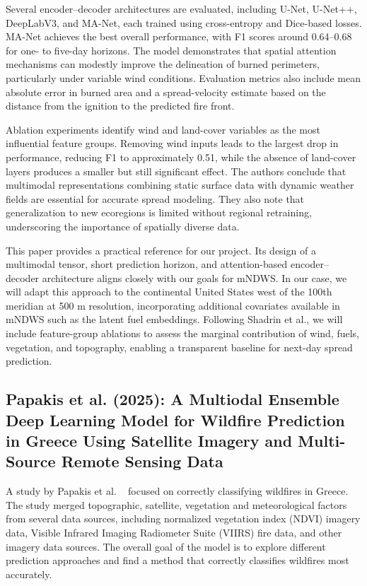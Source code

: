 \documentclass[conference]{IEEEtran}
\begin{document}
Several encoder–decoder architectures are evaluated, including U-Net, U-Net++, DeepLabV3, and MA-Net, each trained using cross-entropy and Dice-based losses. MA-Net achieves the best overall performance, with F1 scores around 0.64–0.68 for one- to five-day horizons. The model demonstrates that spatial attention mechanisms can modestly improve the delineation of burned perimeters, particularly under variable wind conditions. Evaluation metrics also include mean absolute error in burned area and a spread-velocity estimate based on the distance from the ignition to the predicted fire front.

Ablation experiments identify wind and land-cover variables as the most influential feature groups. Removing wind inputs leads to the largest drop in performance, reducing F1 to approximately 0.51, while the absence of land-cover layers produces a smaller but still significant effect. The authors conclude that multimodal representations combining static surface data with dynamic weather fields are essential for accurate spread modeling. They also note that generalization to new ecoregions is limited without regional retraining, underscoring the importance of spatially diverse data.

This paper provides a practical reference for our project. Its design of a multimodal tensor, short prediction horizon, and attention-based encoder–decoder architecture aligns closely with our goals for mNDWS. In our case, we will adapt this approach to the continental United States west of the 100th meridian at 500 m resolution, incorporating additional covariates available in mNDWS such as the latent fuel embeddings. Following Shadrin et al., we will include feature-group ablations to assess the marginal contribution of wind, fuels, vegetation, and topography, enabling a transparent baseline for next-day spread prediction.


\subsection{Papakis et al. (2025): A Multiodal Ensemble Deep Learning Model for Wildfire Prediction in Greece Using Satellite Imagery and Multi-Source Remote Sensing Data}
A study by Papakis et al. \ \cite{papakis2025AMultimodalEnsembleDeepLearning}  focused on correctly classifying wildfires in Greece. The study merged topographic, satellite, vegetation and meteorological factors from several data sources, including normalized vegetation index (NDVI) imagery data, Visible Infrared Imaging Radiometer Suite (VIIRS) fire data, and other imagery data sources. The overall goal of the model is to explore different prediction approaches and find a method that correctly classifies wildfires most accurately.
\end{document}
